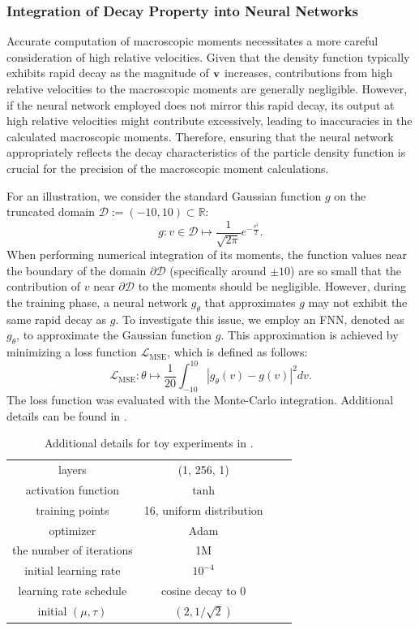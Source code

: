 \documentclass[preprint,12pt]{elsarticle}
\begin{document}
\subsubsection{Integration of Decay Property into Neural Networks}\label{sec:multiplying_gaussian_functions}
Accurate computation of macroscopic moments necessitates a more careful consideration of high relative velocities. Given that the density function typically exhibits rapid decay as the magnitude of ${\bf v}$ increases, contributions from high relative velocities to the macroscopic moments are generally negligible.
However, if the neural network employed does not mirror this rapid decay, its output at high relative velocities might contribute excessively, leading to inaccuracies in the calculated macroscopic moments.
Therefore, ensuring that the neural network appropriately reflects the decay characteristics of the particle density function is crucial for the precision of the macroscopic moment calculations.


For an illustration, we consider the standard Gaussian function $g$ on the truncated domain $\mathcal{D} := (-10, 10) \subset \mathbb{R}$:
\[
    g: v \in \mathcal{D} \mapsto \frac{1}{\sqrt{2\pi}}e^{-\frac{v^2}{2}}.
\]
When performing numerical integration of its moments, the function values near the boundary of the domain $\partial \mathcal{D}$ (specifically around $\pm 10$) are so small that the contribution of $v$ near \(\partial \mathcal{D}\) to the moments should be negligible.
However, during the training phase, a neural network $g_\theta$ that approximates $g$ may not exhibit the same rapid decay as $g$.
To investigate this issue, we employ an FNN, denoted as $g_\theta$, to approximate the Gaussian function $g$.
This approximation is achieved by minimizing a loss function $\mathcal{L}_\mathrm{MSE}$, which is defined as follows:
\begin{equation}\label{eq:l2}
    \mathcal{L}_\mathrm{MSE}: \theta \mapsto \frac{1}{20}\int_{-10}^{10} |g_\theta(v) - g(v)|^2 dv.
\end{equation}
The loss function was evaluated with the Monte-Carlo integration.
Additional details can be found in .


\begin{table}
\centering
\begin{tabular}{ |c|c|c|c| } 
 \hline
    layers & (1, 256, 1) \\
    activation function & $\tanh$ \\
    training points & 16, uniform distribution \\
    optimizer & Adam \\
    the number of iterations & 1M \\
    initial learning rate & $10^{-4}$ \\
    learning rate schedule & cosine decay to $0$ \cite{loshchilov2016sgdr} \\
    initial $(\mu, \tau)$ & $(2, 1/\sqrt{2})$ \\
 \hline
\end{tabular}
\caption{
    Additional details for toy experiments in .
}
\label{tab:toy_experiments}
\end{table}
\end{document}
